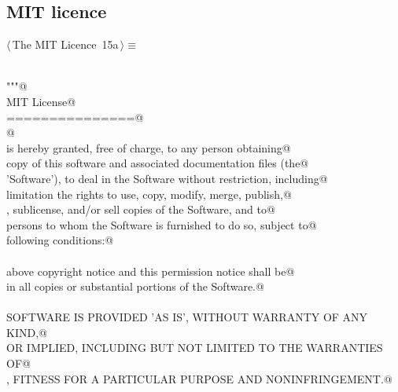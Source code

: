 \documentclass[11pt,oneside]{article}	%
\begin{document}
\subsection{MIT licence}
\begin{flushleft} \small
\begin{minipage}{\linewidth} \label{scrap28}
\protect{}$\langle\,$The MIT Licence\nobreak\ {\footnotesize 15a}$\,\rangle\equiv$
\vspace{-1ex}
\begin{list}{}{} \item
\mbox{}\verb@@\\
\mbox{}\verb@"""@\\
\mbox{}\verb@The MIT License@\\
\mbox{}\verb@===============@\\
\mbox{}\verb@    @\\
\mbox{}\verb@Permission is hereby granted, free of charge, to any person obtaining@\\
\mbox{}\verb@a copy of this software and associated documentation files (the@\\
\mbox{}\verb@'Software'), to deal in the Software without restriction, including@\\
\mbox{}\verb@without limitation the rights to use, copy, modify, merge, publish,@\\
\mbox{}\verb@distribute, sublicense, and/or sell copies of the Software, and to@\\
\mbox{}\verb@permit persons to whom the Software is furnished to do so, subject to@\\
\mbox{}\verb@the following conditions:@\\
\mbox{}\verb@@\\
\mbox{}\verb@The above copyright notice and this permission notice shall be@\\
\mbox{}\verb@included in all copies or substantial portions of the Software.@\\
\mbox{}\verb@@\\
\mbox{}\verb@THE SOFTWARE IS PROVIDED 'AS IS', WITHOUT WARRANTY OF ANY KIND,@\\
\mbox{}\verb@EXPRESS OR IMPLIED, INCLUDING BUT NOT LIMITED TO THE WARRANTIES OF@\\
\mbox{}\verb@MERCHANTABILITY, FITNESS FOR A PARTICULAR PURPOSE AND NONINFRINGEMENT.@\\

\end{list}
\end{minipage}
\end{flushleft}
\end{document}

